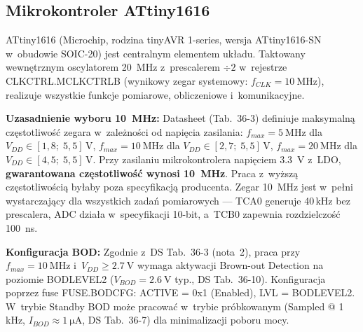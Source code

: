 \documentclass[a4paper,11pt]{article}
\begin{document}
	\subsection{Mikrokontroler ATtiny1616}
	\label{sec:mcu}
	
	ATtiny1616 (Microchip, rodzina tinyAVR 1-series, wersja ATtiny1616-SN
	w~obudowie SOIC-20) jest centralnym elementem
	układu. Taktowany wewnętrznym oscylatorem \SI{20}{\mega\hertz} z~prescalerem
	$\div 2$ w~rejestrze CLKCTRL.MCLKCTRLB (wynikowy zegar systemowy:
	$f_{CLK} = \SI{10}{\mega\hertz}$), realizuje wszystkie funkcje pomiarowe,
	obliczeniowe i~komunikacyjne.
	
	\textbf{Uzasadnienie wyboru \SI{10}{\mega\hertz}:} Datasheet (Tab.~36-3) definiuje
	maksymalną częstotliwość zegara w~zależności od napięcia zasilania:
	$f_{max} = \SI{5}{\mega\hertz}$ dla $V_{DD} \in [1{,}8;\; 5{,}5]$\,V,
	$f_{max} = \SI{10}{\mega\hertz}$ dla $V_{DD} \in [2{,}7;\; 5{,}5]$\,V,
	$f_{max} = \SI{20}{\mega\hertz}$ dla $V_{DD} \in [4{,}5;\; 5{,}5]$\,V.
	Przy zasilaniu mikrokontrolera napięciem \SI{3,3}{\volt} z~LDO,
	\textbf{gwarantowana częstotliwość wynosi \SI{10}{\mega\hertz}}. Praca
	z~wyższą częstotliwością byłaby poza specyfikacją producenta. Zegar
	\SI{10}{\mega\hertz} jest w~pełni wystarczający dla wszystkich zadań
	pomiarowych --- TCA0 generuje 40\,kHz bez prescalera, ADC działa
	w~specyfikacji 10-bit, a~TCB0 zapewnia rozdzielczość \SI{100}{\nano\second}.
	
	\textbf{Konfiguracja BOD:} Zgodnie z~DS Tab.~36-3 (nota~2), praca przy
	$f_{max} = \SI{10}{\mega\hertz}$ i~$V_{DD} \geq \SI{2,7}{\volt}$ wymaga
	aktywacji Brown-out Detection na poziomie BODLEVEL2 ($V_{BOD} = \SI{2,6}{\volt}$
	typ., DS Tab.~36-10). Konfiguracja poprzez fuse FUSE.BODCFG:
	ACTIVE = 0x1 (Enabled), LVL = BODLEVEL2. W~trybie Standby BOD może
	pracować w~trybie próbkowanym (Sampled @ 1\,kHz, $I_{BOD} \approx
	\SI{1}{\micro\ampere}$, DS Tab.~36-7) dla minimalizacji poboru mocy.
	
\end{document}
